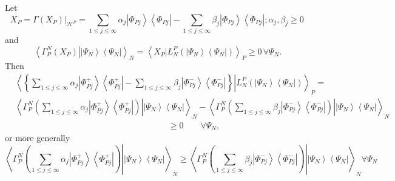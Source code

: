 \documentclass[aps,preprint]{revtex4}%
\begin{document}
Let
\begin{equation}
X_{P}=\left.  \Gamma\left(  X_{P}\right)  \right\vert _{\mathcal{H}^{P}}%
=\sum_{1\leq j\leq\infty}\alpha_{j}\left\vert \Phi_{Pj}\right\rangle
\left\langle \Phi_{Pj}\right\vert -\sum_{1\leq j\leq\infty}\beta_{j}\left\vert
\Phi_{Pj}\right\rangle \left\langle \Phi_{Pj}\right\vert ;\alpha_{j},\beta
_{j}\geq0\,
\end{equation}
and
\begin{equation}
\left\langle \left.  \Gamma_{P}^{N}\left(  X_{P}\right)  \right\vert
\left\vert \Psi_{N}\right\rangle \left\langle \Psi_{N}\right\vert
\right\rangle _{N}=\left\langle \left.  X_{P}\right\vert L_{N}^{P}\left(
\left\vert \Psi_{N}\right\rangle \left\langle \Psi_{N}\right\vert \right)
\right\rangle _{P}\geq0\,\forall\Psi_{N}.
\end{equation}
Then
\begin{align}
&  \left\langle \left.  \left\{  \sum_{1\leq j\leq\infty}\alpha_{j}\left\vert
\Phi_{Pj}^{+}\right\rangle \left\langle \Phi_{Pj}^{+}\right\vert -\sum_{1\leq
j\leq\infty}\beta_{j}\left\vert \Phi_{Pj}^{-}\right\rangle \left\langle
\Phi_{Pj}^{-}\right\vert \right\}  \right\vert L_{N}^{P}\left(  \left\vert
\Psi_{N}\right\rangle \left\langle \Psi_{N}\right\vert \right)  \right\rangle
_{P}=\\
&  \left\langle \left.  \Gamma_{P}^{N}\left(  \sum_{1\leq j\leq\infty}%
\alpha_{j}\left\vert \Phi_{Pj}^{+}\right\rangle \left\langle \Phi_{Pj}%
^{+}\right\vert \right)  \right\vert \left\vert \Psi_{N}\right\rangle
\left\langle \Psi_{N}\right\vert \right\rangle _{N}-\left\langle \left.
\Gamma_{P}^{N}\left(  \sum_{1\leq j\leq\infty}\beta_{j}\left\vert \Phi
_{Pj}^{-}\right\rangle \left\langle \Phi_{Pj}^{-}\right\vert \right)
\right\vert \left\vert \Psi_{N}\right\rangle \left\langle \Psi_{N}\right\vert
\right\rangle _{N}\\
&  \qquad\qquad\qquad\qquad\qquad\qquad\qquad\qquad\qquad\left.  \geq\right.
0\qquad\forall\Psi_{N},
\end{align}
or more generally
\begin{equation}
\left\langle \left.  \Gamma_{P}^{N}\left(  \sum_{1\leq j\leq\infty}\alpha
_{j}\left\vert \Phi_{Pj}^{+}\right\rangle \left\langle \Phi_{Pj}%
^{+}\right\vert \right)  \right\vert \left\vert \Psi_{N}\right\rangle
\left\langle \Psi_{N}\right\vert \right\rangle _{N}\geq\left\langle \left.
\Gamma_{P}^{N}\left(  \sum_{1\leq j\leq\infty}\beta_{j}\left\vert \Phi
_{Pj}^{-}\right\rangle \left\langle \Phi_{Pj}^{-}\right\vert \right)
\right\vert \left\vert \Psi_{N}\right\rangle \left\langle \Psi_{N}\right\vert
\right\rangle _{N}\forall\Psi_{N}%
\end{equation}
\end{document}
